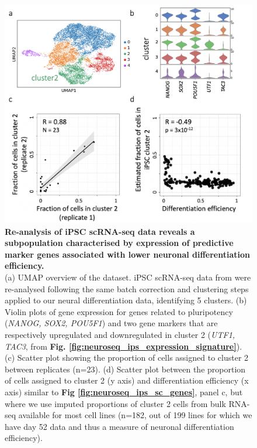\begin{figure}[h]
    \centering
    \includegraphics[width=15cm]{Appendix2/Fig/suppl_ips_cluster2.png}
    \caption[An iPSC sub-population is associated with lower differentiation efficiency]{\textbf{Re-analysis of iPSC scRNA-seq data reveals a subpopulation characterised by expression of predictive marker genes associated with lower neuronal differentiation efficiency.}\\
     (a) UMAP overview of the dataset. 
     iPSC scRNA-seq data from \cite{cuomo2020single} were re-analysed following the same batch correction and clustering steps applied to our neural differentiation data, identifying 5 clusters. 
     (b) Violin plots of gene expression for genes related to pluripotency (\textit{NANOG, SOX2, POU5F1}) and two gene markers that are respectively upregulated and downregulated in cluster 2 (\textit{UTF1, TAC3}, from \textbf{Fig. \ref{fig:neuroseq_ips_expression_signature}}). 
     (c) Scatter plot showing the proportion of cells assigned to cluster 2 between replicates (n=23). 
     (d) Scatter plot between the proportion of cells assigned to cluster 2 (y axis) and differentiation efficiency (x axis) similar to \textbf{Fig \ref{fig:neuroseq_ips_sc_genes}}, panel c, but where we use imputed proportions of cluster 2 cells from bulk RNA-seq available for most cell lines (n=182, out of 199 lines for which we have day 52 data and thus a measure of neuronal differentiation efficiency).}
    \label{suppl_fig:ipsc_cluster2}
\end{figure}


